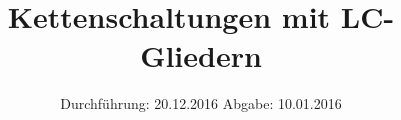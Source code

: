 

\subject{V356}
\title{Kettenschaltungen mit LC-Gliedern}
\date{
	\centering
	Durchführung: 20.12.2016
	\hspace{3em}
	Abgabe: 10.01.2016
}



\maketitle
\thispagestyle{empty}
\tableofcontents
\newpage



%




\printbibliography


